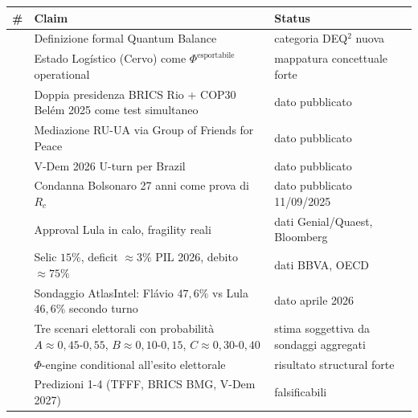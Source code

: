 {\def\LTcaptype{none} %
{\small\begin{longtable}[]{@{}
  >{\raggedright\arraybackslash}p{}
  >{\raggedright\arraybackslash}p{}
  >{\raggedright\arraybackslash}p{}@{}}
\toprule\noalign{}
\begin{minipage}[b]{\linewidth}\raggedright
\#
\end{minipage} & \begin{minipage}[b]{\linewidth}\raggedright
Claim
\end{minipage} & \begin{minipage}[b]{\linewidth}\raggedright
Status
\end{minipage} \\
\midrule\noalign{}
\endhead
\bottomrule\noalign{}
\endlastfoot
1 & Definizione formal Quantum Balance & \Hypoth{} categoria
DEQ$^2$ nuova \\
2 & Estado Logístico (Cervo) come \(\Phi^{\text{esportabile}}\)
operational & \Hypoth{} mappatura concettuale forte \\
3 & Doppia presidenza BRICS Rio + COP30 Belém 2025 come test simultaneo
& \Proved{} dato pubblicato \\
4 & Mediazione RU-UA via Group of Friends for Peace & \Proved{} dato
pubblicato \\
5 & V-Dem 2026 U-turn per Brazil & \Proved{} dato pubblicato \\
6 & Condanna Bolsonaro 27 anni come prova di \(R_c\) & \Proved{} dato
pubblicato 11/09/2025 \\
7 & Approval Lula in calo, fragility reali & \Proved{} dati
Genial/Quaest, Bloomberg \\
8 & Selic \(15\%\), deficit \(\approx 3\%\) PIL 2026, debito
\(\approx 75\%\) & \Proved{} dati BBVA, OECD \\
9 & Sondaggio AtlasIntel: Flávio \(47{,}6\%\) vs Lula \(46{,}6\%\)
secondo turno & \Proved{} dato aprile 2026 \\
10 & Tre scenari elettorali con probabilità
\(A \approx 0{,}45\)-\(0{,}55\), \(B \approx 0{,}10\)-\(0{,}15\),
\(C \approx 0{,}30\)-\(0{,}40\) & \Conj{} stima soggettiva da sondaggi
aggregati \\
11 & \(\Phi\)-engine conditional all'esito elettorale & \Hypoth{}
risultato structural forte \\
12 & Predizioni 1-4 (TFFF, BRICS BMG, V-Dem 2027) & \Conj{}
falsificabili \\
\end{longtable}}
}



